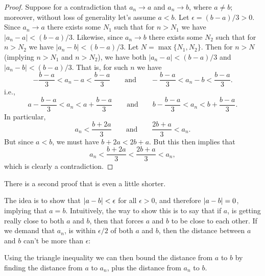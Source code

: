 \begin{proof}
  Suppose for a contradiction that $a_n \to a$ and $a_n \to b$, where
  $a \neq b$; moreover, without loss of generality let's assume $a <
  b$. Let $\epsilon = (b - a)/3 > 0$. Since $a_n \to a$ there
  exists some $N_1$ such that for $n > N_1$ we have $|a_n - a| < (b -
  a)/3$. Likewise, since $a_n \to b$ there exists some $N_2$ such
  that for $n > N_2$ we have $|a_n - b| < (b - a)/3$. Let $N =
  \max\{N_1, N_2\}$. Then for $n > N$ (implying $n > N_1$ and $n >
  N_2$), we have both $|a_n - a| < (b - a)/3$ and $|a_n - b| < (b -
  a)/3$. That is, for such $n$ we have
  \[ -\frac{b-a}{3} < a_n - a < \frac{b-a}{3} \qquad \text{and}
  \qquad -\frac{b-a}{3} < a_n - b < \frac{b-a}{3}. \]
  i.e.,
  \[ a - \frac{b-a}{3} < a_n < a + \frac{b-a}{3} \qquad \text{and}
  \qquad b - \frac{b-a}{3} < a_n < b + \frac{b-a}{3}. \]
  In particular,
  \[ a_n < \frac{b+2a}{3} \qquad \text{and} \qquad \frac{2b+a}{3} < a_n. \]
  But since $a < b$, we must have $b + 2a < 2b + a$. But this then implies that
  \[ a_n < \frac{b+2a}{3} < \frac{2b+a}{3} < a_n, \]
  which is clearly a contradiction.
\end{proof}

There is a second proof that is even a little shorter.

\begin{proofidea}
  The idea is to show that $| a - b | < \epsilon$ for all $\epsilon
  > 0$, and therefore $| a - b | = 0$, implying that $a = b$.
  Intuitively, the way to show this is to say that if $a$, is getting
  really close to both $a$ and $b$, then that forces $a$ and $b$ to
  be close to each other. If we demand that $a_n$, is within
  $\epsilon/2$ of both $a$ and $b$, then the distance between $a$ and
  $b$ can't be more than $\epsilon$:

  \begin{tightfigure}
    \centering
  \end{tightfigure}

  Using the triangle inequality we can then bound the distance from
  $a$ to $b$ by finding the distance from $a$ to $a_n$, plus the
  distance from $a_n$ to $b$.
\end{proofidea}

